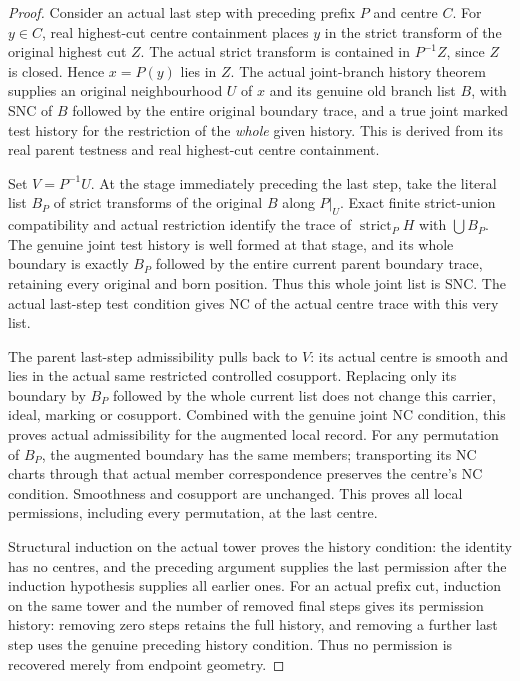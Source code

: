 \begin{proof}
Consider an actual last step with preceding prefix $P$ and centre $C$.
For $y\in C$, real highest-cut centre containment places $y$ in the
strict transform of the original highest cut $Z$. The actual strict
transform is contained in $P^{-1}Z$, since $Z$ is closed. Hence
$x=P(y)$ lies in $Z$. The actual joint-branch history theorem supplies
an original neighbourhood $U$ of $x$ and its genuine old branch list
$B$, with SNC of $B$ followed by the entire original boundary trace,
and a true joint marked test history for the restriction of the
\emph{whole} given history. This is derived from its real parent
testness and real highest-cut centre containment.

Set $V=P^{-1}U$. At the stage immediately preceding the last step, take
the literal list $B_P$ of strict transforms of the original $B$ along
$P|_U$. Exact finite strict-union compatibility and actual restriction
identify the trace of $\operatorname{strict}_P H$ with $\bigcup B_P$.
The genuine joint test history is well formed at that stage, and its
whole boundary is exactly $B_P$ followed by the entire current parent
boundary trace, retaining every original and born position. Thus this
whole joint list is SNC. The actual last-step test condition gives NC
of the actual centre trace with this very list.

The parent last-step admissibility pulls back to $V$: its actual centre
is smooth and lies in the actual same restricted controlled cosupport.
Replacing only its boundary by $B_P$ followed by the whole current list
does not change this carrier, ideal, marking or cosupport. Combined
with the genuine joint NC condition, this proves actual admissibility
for the augmented local record. For any permutation of $B_P$, the
augmented boundary has the same members; transporting its NC charts
through that actual member correspondence preserves the centre's NC
condition. Smoothness and cosupport are unchanged. This proves all
local permissions, including every permutation, at the last centre.

Structural induction on the actual tower proves the history condition:
the identity has no centres, and the preceding argument supplies the
last permission after the induction hypothesis supplies all earlier
ones. For an actual prefix cut, induction on the same tower and the
number of removed final steps gives its permission history: removing
zero steps retains the full history, and removing a further last step
uses the genuine preceding history condition. Thus no permission is
recovered merely from endpoint geometry.
\end{proof}

